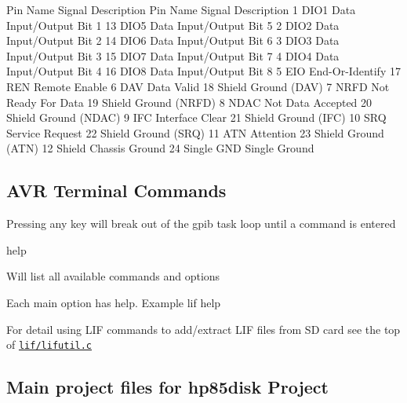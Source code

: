 \begin{DoxyPre}
    Pin Name   Signal Description       Pin Name   Signal Description 
    1   DIO1   Data Input/Output Bit 1  13  DIO5   Data Input/Output Bit 5 
    2   DIO2   Data Input/Output Bit 2  14  DIO6   Data Input/Output Bit 6 
    3   DIO3   Data Input/Output Bit 3  15  DIO7   Data Input/Output Bit 7 
    4   DIO4   Data Input/Output Bit 4  16  DIO8   Data Input/Output Bit 8 
    5   EIO    End-Or-Identify          17  REN    Remote Enable 
    6   DAV    Data Valid               18  Shield Ground (DAV) 
    7   NRFD   Not Ready For Data       19  Shield Ground (NRFD) 
    8   NDAC   Not Data Accepted        20  Shield Ground (NDAC) 
    9   IFC    Interface Clear          21  Shield Ground (IFC) 
    10  SRQ    Service Request          22  Shield Ground (SRQ) 
    11  ATN    Attention                23  Shield Ground (ATN) 
    12  Shield Chassis Ground           24  Single GND Single Ground
\end{DoxyPre}


\subsection*{A\+VR Terminal Commands}


\begin{DoxyItemize}
\item Pressing any key will break out of the gpib task loop until a command is entered
\begin{DoxyItemize}
\item help
\begin{DoxyItemize}
\item Will list all available commands and options
\item Each main option has help. Example lif help
\end{DoxyItemize}
\item For detail using L\+IF commands to add/extract L\+IF files from SD card see the top of \href{lif/lifutil.c}{\tt lif/lifutil.\+c}
\end{DoxyItemize}
\end{DoxyItemize}





\subsection*{Main project files for hp85disk Project}


